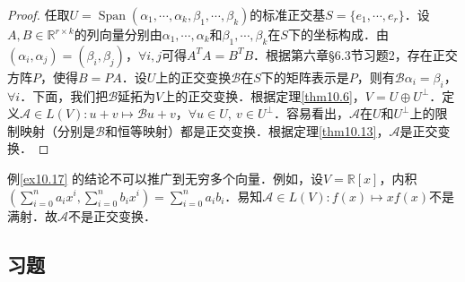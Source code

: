 \documentclass[a4paper,fontset=windows]{ctexbook}
\theoremstyle{definition}
\DeclareMathOperator{\Span}{Span}
\begin{document}
\begin{proof}
任取$U=\Span(\alpha_1,\cdots,\alpha_k,\beta_1,\cdots,\beta_k)$的标准正交基$S=\{e_1,\cdots,e_r\}$．设$A,B\in\mathbb{R}^{r\times k}$的列向量分别由$\alpha_1,\cdots,\alpha_k$和$\beta_1,\cdots,\beta_k$在$S$下的坐标构成．由$(\alpha_i,\alpha_j)=(\beta_i,\beta_j)$，$\forall i,j$可得$A^TA=B^TB$．根据第六章\S 6.3节习题2，存在正交方阵$P$，使得$B=PA$．设$U$上的正交变换$\mathcal{B}$在$S$下的矩阵表示是$P$，则有$\mathcal{B}\alpha_i=\beta_i$，$\forall i$．下面，我们把$\mathcal{B}$延拓为$V$上的正交变换．根据定理\ref{thm10.6}，$V=U\oplus U^\perp$．定义$\mathcal{A}\in L(V):u+v\mapsto\mathcal{B}u+v$，$\forall u\in U,~v\in U^\perp$．容易看出，$\mathcal{A}$在$U$和$U^\perp$上的限制映射（分别是$\mathcal{B}$和恒等映射）都是正交变换．根据定理\ref{thm10.13}，$\mathcal{A}$是正交变换．
\end{proof}

例\ref{ex10.17} 的结论不可以推广到无穷多个向量．例如，设$V=\mathbb{R}[x]$，内积$\left(\sum\limits_{i=0}^na_ix^i,\sum\limits_{i=0}^nb_ix^i\right)=\sum\limits_{i=0}^na_ib_i$．易知$\mathcal{A}\in L(V):f(x)\mapsto xf(x)$不是满射．故$\mathcal{A}$不是正交变换．

\subsection*{习题}
\end{document}
